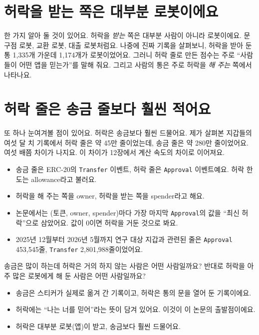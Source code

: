 \section{허락을 받는 쪽은 대부분 로봇이에요}

한 가지 알아 둘 것이 있어요.
허락을 \emph{받는} 쪽은 대부분 사람이 아니라 로봇이에요.
문구점 로봇, 교환 로봇, 대출 로봇처럼요.
나중에 진짜 기록을 살펴보니, 허락을 받아 둔 통 1,335개 가운데 1,174개가 로봇이었어요.
그러니 허락 줄로 만든 점수는 주로 “사람들이 어떤 앱을 믿는가”를 말해 줘요.
그리고 사람의 통은 주로 허락을 \emph{해 주는} 쪽에서 나타나요.

\section{허락 줄은 송금 줄보다 훨씬 적어요}

또 하나 눈여겨볼 점이 있어요.
허락은 송금보다 훨씬 드물어요.
제가 살펴본 지갑들의 여섯 달 치 기록에서 허락 줄은 약 45만 줄이었는데, 송금 줄은 약 280만 줄이었어요.
여섯 배쯤 차이가 나지요.
이 차이가 12장에서 계산 속도의 차이로 이어져요.

\begin{deeper}[진짜 용어]
\begin{itemize}
\item 송금 줄은 ERC-20의 \texttt{Transfer} 이벤트, 허락 줄은 \texttt{Approval} 이벤트예요. 허락 한도는 allowance라고 불러요.
\item 허락을 해 주는 쪽을 owner, 허락을 받는 쪽을 spender라고 해요.
\item 논문에서는 (토큰, owner, spender)마다 가장 마지막 \texttt{Approval}의 값을 “최신 허락”으로 삼았어요. 값이 0이면 허락을 거둔 것으로 봐요.
\item 2025년 12월부터 2026년 5월까지 연구 대상 지갑과 관련된 줄은 \texttt{Approval} 453,545줄, \texttt{Transfer} 2,801,988줄이었어요.
\end{itemize}
\end{deeper}

\begin{think}
송금은 많이 하는데 허락은 거의 하지 않는 사람은 어떤 사람일까요?
반대로 허락을 아주 많은 로봇에게 해 둔 사람은 어떤 사람일까요?
\end{think}

\begin{learned}
\begin{itemize}
\item 송금은 스티커가 실제로 옮겨 간 기록이고, 허락은 통의 문을 열어 둔 기록이에요.
\item 허락에는 “나는 너를 믿어”라는 뜻이 담겨 있어요. 이것이 이 논문의 출발점이에요.
\item 허락은 대부분 로봇(앱)이 받고, 송금보다 훨씬 드물어요.
\end{itemize}
\end{learned}
